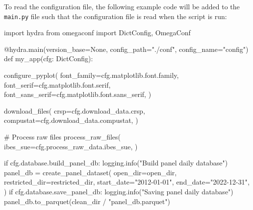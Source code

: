 \documentclass[
  letterpaper,
  DIV=11,
  numbers=noendperiod]{scrartcl}
\newenvironment{Shaded}{\begin{snugshade}}{\end{snugshade}}
\newcommand{\AttributeTok}[1]{\textcolor[rgb]{0.40,0.45,0.13}{#1}}
\newcommand{\CommentTok}[1]{\textcolor[rgb]{0.37,0.37,0.37}{#1}}
\newcommand{\ControlFlowTok}[1]{\textcolor[rgb]{0.00,0.23,0.31}{#1}}
\newcommand{\ImportTok}[1]{\textcolor[rgb]{0.00,0.46,0.62}{#1}}
\newcommand{\KeywordTok}[1]{\textcolor[rgb]{0.00,0.23,0.31}{#1}}
\newcommand{\NormalTok}[1]{\textcolor[rgb]{0.00,0.23,0.31}{#1}}
\newcommand{\OperatorTok}[1]{\textcolor[rgb]{0.37,0.37,0.37}{#1}}
\newcommand{\StringTok}[1]{\textcolor[rgb]{0.13,0.47,0.30}{#1}}
\newcommand{\VariableTok}[1]{\textcolor[rgb]{0.07,0.07,0.07}{#1}}
\begin{document}
To read the configuration file, the following example code will be added
to the \texttt{main.py} file such that the configuration file is read
when the script is run:

\begin{Shaded}
\begin{Highlighting}[]
\ImportTok{import}\NormalTok{ hydra}
\ImportTok{from}\NormalTok{ omegaconf }\ImportTok{import}\NormalTok{ DictConfig, OmegaConf}

\AttributeTok{@hydra.main}\NormalTok{(version\_base}\OperatorTok{=}\VariableTok{None}\NormalTok{, config\_path}\OperatorTok{=}\StringTok{"./conf"}\NormalTok{, config\_name}\OperatorTok{=}\StringTok{"config"}\NormalTok{)}
\KeywordTok{def}\NormalTok{ my\_app(cfg: DictConfig):}

\NormalTok{    configure\_pyplot(}
\NormalTok{        font\_family}\OperatorTok{=}\NormalTok{cfg.matplotlib.font.family,}
\NormalTok{        font\_serif}\OperatorTok{=}\NormalTok{cfg.matplotlib.font.serif,}
\NormalTok{        font\_sans\_serif}\OperatorTok{=}\NormalTok{cfg.matplotlib.font.sans\_serif,}
\NormalTok{    )}

\NormalTok{    download\_files(}
\NormalTok{        crsp}\OperatorTok{=}\NormalTok{cfg.download\_data.crsp,}
\NormalTok{        compustat}\OperatorTok{=}\NormalTok{cfg.download\_data.compustat,}
\NormalTok{    )}

    \CommentTok{\# Process raw files}
\NormalTok{    process\_raw\_files(}
\NormalTok{        ibes\_sue}\OperatorTok{=}\NormalTok{cfg.process\_raw\_data.ibes\_sue,}
\NormalTok{    )}

    \ControlFlowTok{if}\NormalTok{ cfg.database.build\_panel\_db:}
\NormalTok{        logging.info(}\StringTok{"Build panel daily database"}\NormalTok{)}
\NormalTok{        panel\_db }\OperatorTok{=}\NormalTok{ create\_panel\_dataset(}
\NormalTok{            open\_dir}\OperatorTok{=}\NormalTok{open\_dir,}
\NormalTok{            restricted\_dir}\OperatorTok{=}\NormalTok{restricted\_dir,}
\NormalTok{            start\_date}\OperatorTok{=}\StringTok{"2012{-}01{-}01"}\NormalTok{,}
\NormalTok{            end\_date}\OperatorTok{=}\StringTok{"2022{-}12{-}31"}\NormalTok{,}
\NormalTok{        )}
    \ControlFlowTok{if}\NormalTok{ cfg.database.save\_panel\_db:}
\NormalTok{        logging.info(}\StringTok{"Saving panel daily database"}\NormalTok{)}
\NormalTok{        panel\_db.to\_parquet(clean\_dir }\OperatorTok{/} \StringTok{"panel\_db.parquet"}\NormalTok{)}
\end{Highlighting}
\end{Shaded}
\end{document}
